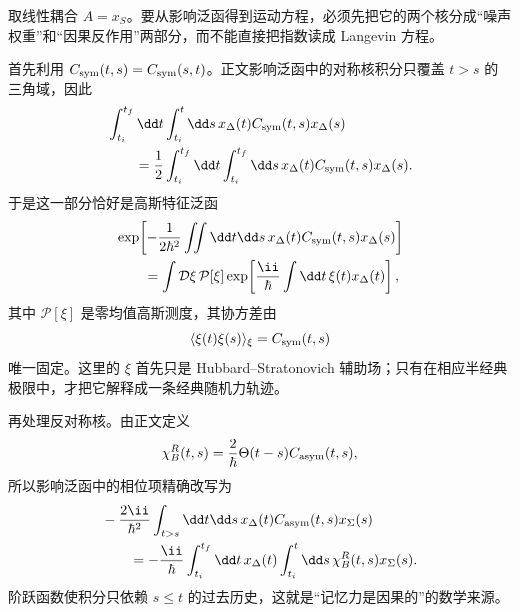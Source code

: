 











\begin{derivation}[影响泛函中的随机力与因果反作用]
取线性耦合 $A=x_S$。要从影响泛函得到运动方程，必须先把它的两个核分成“噪声权重”和“因果反作用”两部分，而不能直接把指数读成 Langevin 方程。

首先利用 $C_{\rm sym}(t,s)=C_{\rm sym}(s,t)$。正文影响泛函中的对称核积分只覆盖 $t>s$ 的三角域，因此
\begin{align*}
 &\int_{t_i}^{t_f}\dd t\int_{t_i}^{t}\dd s\,
 x_\Delta(t)C_{\rm sym}(t,s)x_\Delta(s)\\
 &\qquad=\frac12
 \int_{t_i}^{t_f}\dd t\int_{t_i}^{t_f}\dd s\,
 x_\Delta(t)C_{\rm sym}(t,s)x_\Delta(s).
\end{align*}
于是这一部分恰好是高斯特征泛函
\begin{align*}
 &\exp\!\left[-\frac{1}{2\hbar^2}
 \iint\dd t\dd s\,
 x_\Delta(t)C_{\rm sym}(t,s)x_\Delta(s)\right]\\
 &\qquad=
 \int\mathcal D\xi\,\mathcal P[\xi]
 \exp\!\left[\frac{\ii}{\hbar}
 \int\dd t\,\xi(t)x_\Delta(t)\right],
\end{align*}
其中 $\mathcal P[\xi]$ 是零均值高斯测度，其协方差由
\begin{equation*}
 \langle\xi(t)\xi(s)\rangle_\xi=C_{\rm sym}(t,s)
\end{equation*}
唯一固定。这里的 $\xi$ 首先只是 Hubbard--Stratonovich 辅助场；只有在相应半经典极限中，才把它解释成一条经典随机力轨迹。

再处理反对称核。由正文定义
\begin{equation*}
 \chi_B^R(t,s)
 =\frac{2}{\hbar}\Theta(t-s)C_{\rm asym}(t,s),
\end{equation*}
所以影响泛函中的相位项精确改写为
\begin{align*}
 &-\frac{2\ii}{\hbar^2}
 \int_{t>s}\dd t\dd s\,
 x_\Delta(t)C_{\rm asym}(t,s)x_\Sigma(s)\\
 &\qquad=-\frac{\ii}{\hbar}
 \int_{t_i}^{t_f}\dd t\,x_\Delta(t)
 \int_{t_i}^{t}\dd s\,
 \chi_B^R(t,s)x_\Sigma(s).
\end{align*}
阶跃函数使积分只依赖 $s\le t$ 的过去历史，这就是“记忆力是因果的”的数学来源。


\end{derivation}
